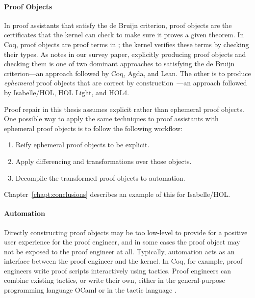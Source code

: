 \paragraph{Proof Objects} 
In proof assistants that satisfy the de Bruijn criterion, proof objects are the certificates that the kernel can check to make sure it proves a given theorem.
In Coq, proof objects are proof terms in ; the kernel verifies these terms by checking their types.
As  notes in our survey paper, explicitly producing proof objects and checking them is one of two dominant approaches to satisfying 
the de Bruijn criterion---an approach followed by Coq, Agda, and Lean.
The other is to produce \textit{ephemeral} proof objects that are correct by construction~\cite{Barendregt2013}---an approach followed
by Isabelle/HOL, HOL Light, and HOL4. %

Proof repair in this thesis assumes explicit rather than ephemeral proof objects.
One possible way to apply the same techniques to proof assistants with ephemeral proof objects is to follow the following workflow:

\begin{enumerate}
\item Reify ephemeral proof objects to be explicit.
\item Apply differencing and transformations over those objects.
\item Decompile the transformed proof objects to automation.
\end{enumerate}
Chapter~\ref{chapt:conclusions} describes an example of this for Isabelle/HOL.

\paragraph{Automation} %
Directly constructing proof objects may be too low-level to provide for a positive user experience for the proof engineer,
and in some cases the proof object may not be exposed to the proof engineer at all.
Typically, automation acts as an interface between the proof engineer and the kernel.
In Coq, for example, proof engineers write proof scripts interactively using tactics.
Proof engineers can combine existing tactics, or write their own, either in the general-purpose programming language
OCaml or in the tactic language . 

